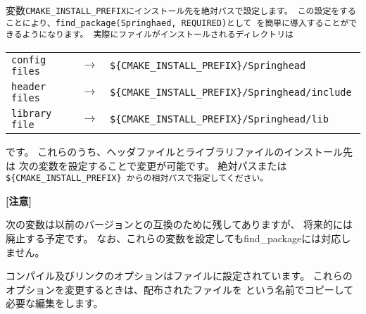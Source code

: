 変数\tt{CMAKE\_INSTALL\_PREFIX}にインストール先を絶対パスで設定します。
この設定をすることにより、\tt{find\_package(Springhaed, REQUIRED)}として
\SprLib を簡単に導入することができるようになります。
\medskip
実際にファイルがインストールされるディレクトリは
\def\IP{\$\{CMAKE\_INSTALL\_PREFIX\}}
\begin{narrow}[s]
	\def\RA{$\rightarrow$}
	\begin{tabular}{lcl}
		\tt{config files} & \RA & \tt{\IP/Springhead} \\
		\tt{header files} & \RA & \tt{\IP/Springhead/include} \\
		\tt{library file} & \RA & \tt{\IP/Springhead/lib} \\
	\end{tabular}
\end{narrow}
です。
これらのうち、ヘッダファイルとライブラリファイルのインストール先は
次の変数を設定することで変更が可能です。
絶対パスまたは\tt{\,\IP\,}からの相対パスで指定してください。

\bigskip
\small{\bf{[注意]}}

\begin{narrow}[s]
	次の変数は以前のバージョンとの互換のために残してありますが、
	将来的には廃止する予定です。
	なお、これらの変数を設定してもfind\_packageには対応しません。
\end{narrow}

\bigskip
コンパイル及びリンクのオプションはファイルに設定されています。
これらのオプションを変更するときは、配布されたファイルを
\QCMakeOpts{}という名前でコピーして必要な編集をします。


